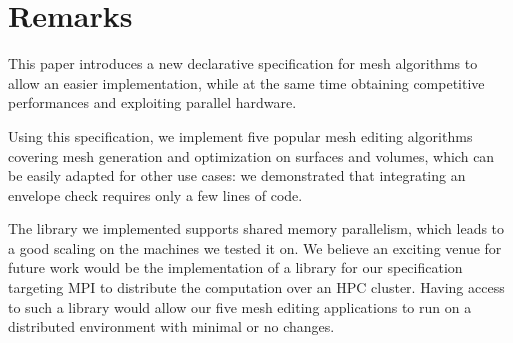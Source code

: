 \section{Remarks}

This paper introduces a new declarative specification for mesh algorithms to allow an easier implementation, while at the same time obtaining competitive performances and exploiting parallel hardware. 

Using this specification, we implement {five} popular mesh editing algorithms covering mesh generation and optimization on surfaces and volumes, which can be easily adapted for other use cases: we demonstrated that integrating an envelope check {requires} only a few lines of code.

The library we implemented supports shared memory parallelism, which leads to a good scaling on the machines we tested it on. We believe an exciting venue for future work would be the implementation of a library {for} our specification targeting  MPI to distribute the computation over an HPC cluster. Having access to such a library would allow our five mesh editing applications to run on a distributed environment with minimal or no changes.


